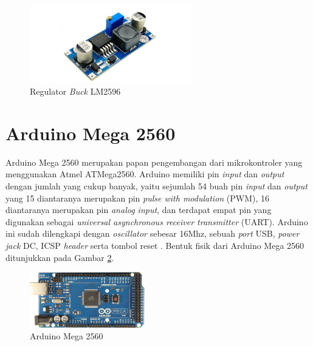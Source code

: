 \begin{figure}[H]
	\centering
	\includegraphics[width=7cm]{gambar/lm2596.jpg}
	\caption{Regulator \textit{Buck} LM2596\cite{Minikits}}
	\label{pic.lm2596}
\end{figure}

\section{Arduino Mega 2560}
Arduino Mega 2560  merupakan papan pengembangan dari mikrokontroler yang menggunakan Atmel ATMega2560. Arduino  memiliki pin \textit{input} dan \textit{output} dengan jumlah yang cukup banyak, yaitu sejumlah 54 buah pin \textit{input} dan \textit{output} yang 15 diantaranya merupakan pin \textit{pulse with modulation} (PWM), 16 diantaranya merupakan pin \textit{analog input}, dan terdapat empat pin yang digunakan sebagai \textit{universal asynchronous receiver transmitter} (UART). Arduino ini sudah dilengkapi dengan \textit{oscillator} sebesar 16Mhz, sebuah \textit{port} USB, \textit{power jack} DC, ICSP \textit{header} serta tombol reset \cite{arduino}. Bentuk fisik dari Arduino Mega 2560 ditunjukkan pada Gambar \ref{pic.arudinomega}.
\begin{figure}[H]
	\centering
	\includegraphics[width=5cm]{gambar/arduino_mega.jpg}
	\caption{Arduino Mega 2560\cite{arduino}}
	\label{pic.arudinomega}
\end{figure}

